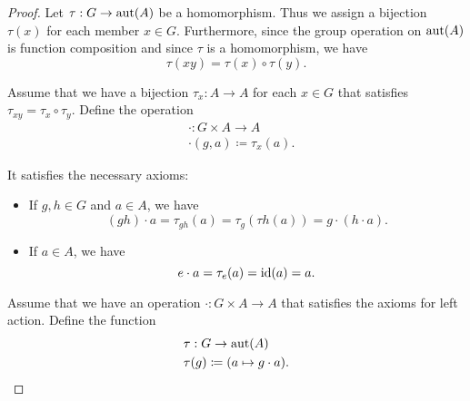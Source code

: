 \begin{proof}
   Let \( \tau: G \to \operatorname{aut}(A) \) be a homomorphism. Thus we assign a bijection \( \tau(x) \) for each member \( x \in G \). Furthermore, since the group operation on \( \operatorname{aut}(A) \) is function composition and since \( \tau \) is a homomorphism, we have
  \begin{equation*}
    \tau(xy) = \tau(x) \circ \tau(y).
  \end{equation*}

   Assume that we have a bijection \( \tau_x: A \to A \) for each \( x \in G \) that satisfies \( \tau_{xy} = \tau_x \circ \tau_y \). Define the operation
  \begin{align*}
     & \cdot: G \times A \to A          \\
     & \cdot(g, a) \coloneqq \tau_x(a).
  \end{align*}

  It satisfies the necessary axioms:
  \begin{itemize}
    \item If \( g, h \in G \) and \( a \in A \), we have
          \begin{equation*}
            (g h) \cdot a
            =
            \tau_{g h}(a)
            =
            \tau_{g}(\tau{h}(a))
            =
            g \cdot (h \cdot a).
          \end{equation*}

    \item If \( a \in A \), we have
          \begin{equation*}
            e \cdot a
            =
            \tau_e(a)
            =
            \operatorname{id}(a)
            =
            a.
          \end{equation*}
  \end{itemize}

   Assume that we have an operation \( \cdot: G \times A \to A \) that satisfies the axioms for left action. Define the function
  \begin{align*}
     & \tau: G \to \operatorname{aut}(A)                      \\
     & \tau(g) \coloneqq (a \mapsto g \cdot a).
  \end{align*}


\end{proof}

